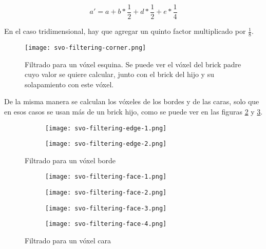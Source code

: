 $$
a' = a + b * \frac{1}{2} + d * \frac{1}{2} + e * \frac{1}{4}
$$

En el caso tridimensional, hay que agregar un quinto factor multiplicado por $\frac{1}{8}$.


\begin{figure}
    \centering
    \texttt{[image: svo-filtering-corner.png]}
    \caption{
        Filtrado para un vóxel esquina.
        Se puede ver el vóxel del brick padre cuyo valor se quiere calcular, junto con el brick del hijo y su solapamiento con este vóxel.
    }
    \label{fig:svo_filtering_corners}
\end{figure}

De la misma manera se calculan los vóxeles de los bordes y de las caras, solo que en esos casos se usan más de un brick hijo, como se puede ver en las figuras \ref{fig:svo_filtering_edges} y \ref{fig:svo_filtering_faces}.

\begin{figure}
    \begin{center}
        \begin{subfigure}{.24\textwidth}
            \texttt{[image: svo-filtering-edge-1.png]}
        \end{subfigure}
        \begin{subfigure}{.24\textwidth}
            \texttt{[image: svo-filtering-edge-2.png]}
        \end{subfigure}
    \end{center}
    \caption{Filtrado para un vóxel borde}
    \label{fig:svo_filtering_edges}
\end{figure}

\begin{figure}
    \begin{center}
        \begin{subfigure}{.24\textwidth}
            \texttt{[image: svo-filtering-face-1.png]}
        \end{subfigure}
        \begin{subfigure}{.24\textwidth}
            \texttt{[image: svo-filtering-face-2.png]}
        \end{subfigure}
        \begin{subfigure}{.24\textwidth}
            \texttt{[image: svo-filtering-face-3.png]}
        \end{subfigure}
        \begin{subfigure}{.24\textwidth}
            \texttt{[image: svo-filtering-face-4.png]}
        \end{subfigure}
    \end{center}
    \caption{Filtrado para un vóxel cara}
    \label{fig:svo_filtering_faces}
\end{figure}

